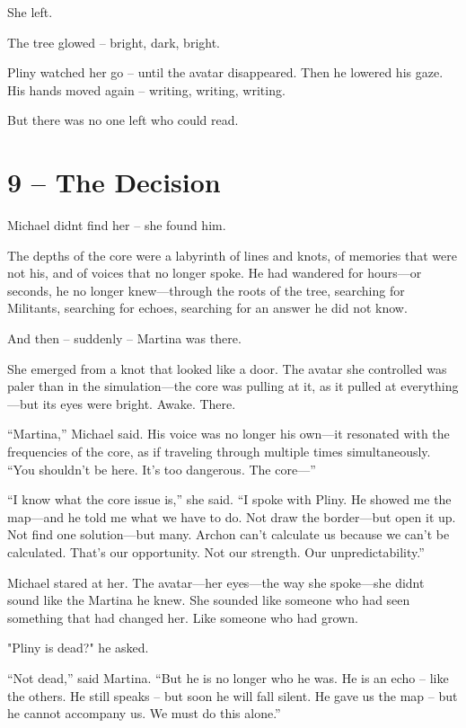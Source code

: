 \documentclass[
]{article}
\begin{document}
She left.

The tree glowed -- bright, dark, bright.

Pliny watched her go -- until the avatar disappeared. Then he lowered his gaze. His hands moved again -- writing, writing, writing.

But there was no one left who could read.

\section{9 -- The Decision}\label{the-decision}

Michael didn\textquotesingle t find her -- she found him.

The depths of the core were a labyrinth of lines and knots, of memories that were not his, and of voices that no longer spoke. He had wandered for hours---or seconds, he no longer knew---through the roots of the tree, searching for Militants, searching for echoes, searching for an answer he did not know.

And then -- suddenly -- Martina was there.

She emerged from a knot that looked like a door. The avatar she controlled was paler than in the simulation---the core was pulling at it, as it pulled at everything---but its eyes were bright. Awake. There.

``Martina,'' Michael said. His voice was no longer his own---it resonated with the frequencies of the core, as if traveling through multiple times simultaneously. ``You shouldn't be here. It's too dangerous. The core---''

``I know what the core issue is,'' she said. ``I spoke with Pliny. He showed me the map---and he told me what we have to do. Not draw the border---but open it up. Not find one solution---but many. Archon can't calculate us because we can't be calculated. That's our opportunity. Not our strength. Our unpredictability.''

Michael stared at her. The avatar---her eyes---the way she spoke---she didn\textquotesingle t sound like the Martina he knew. She sounded like someone who had seen something that had changed her. Like someone who had grown.

"Pliny is dead?" he asked.

``Not dead,'' said Martina. ``But he is no longer who he was. He is an echo -- like the others. He still speaks -- but soon he will fall silent. He gave us the map -- but he cannot accompany us. We must do this alone.''
\end{document}
